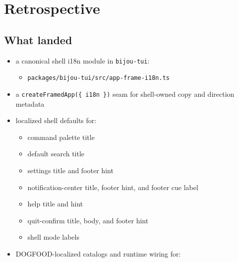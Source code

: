 \section{Retrospective}\label{record-194-retrospective}

\subsection{What landed}\label{record-194-what-landed}

\begin{itemize}
\tightlist
\item
  a canonical shell i18n module in \texttt{b\allowbreak{}i\allowbreak{}j\allowbreak{}o\allowbreak{}u\allowbreak{}-\allowbreak{}t\allowbreak{}u\allowbreak{}i}:

  \begin{itemize}
  \tightlist
  \item
    \texttt{p\allowbreak{}a\allowbreak{}c\allowbreak{}k\allowbreak{}a\allowbreak{}g\allowbreak{}e\allowbreak{}s\allowbreak{}/\allowbreak{}b\allowbreak{}i\allowbreak{}j\allowbreak{}o\allowbreak{}u\allowbreak{}-\allowbreak{}t\allowbreak{}u\allowbreak{}i\allowbreak{}/\allowbreak{}s\allowbreak{}r\allowbreak{}c\allowbreak{}/\allowbreak{}a\allowbreak{}p\allowbreak{}p\allowbreak{}-\allowbreak{}f\allowbreak{}r\allowbreak{}a\allowbreak{}m\allowbreak{}e\allowbreak{}-\allowbreak{}i\allowbreak{}1\allowbreak{}8\allowbreak{}n\allowbreak{}.\allowbreak{}t\allowbreak{}s}
  \end{itemize}
\item
  a \texttt{c\allowbreak{}r\allowbreak{}e\allowbreak{}a\allowbreak{}t\allowbreak{}e\allowbreak{}F\allowbreak{}r\allowbreak{}a\allowbreak{}m\allowbreak{}e\allowbreak{}d\allowbreak{}A\allowbreak{}p\allowbreak{}p\allowbreak{}(\allowbreak{}\{\allowbreak{} \allowbreak{}i\allowbreak{}1\allowbreak{}8\allowbreak{}n\allowbreak{} \allowbreak{}\}\allowbreak{})} seam for shell-owned copy and direction metadata
\item
  localized shell defaults for:

  \begin{itemize}
  \tightlist
  \item
    command palette title
  \item
    default search title
  \item
    settings title and footer hint
  \item
    notification-center title, footer hint, and footer cue label
  \item
    help title and hint
  \item
    quit-confirm title, body, and footer hint
  \item
    shell mode labels
  \end{itemize}
\item
  DOGFOOD-localized catalogs and runtime wiring for:


\end{itemize}
